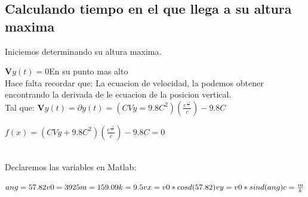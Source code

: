\documentclass{article}
\theoremstyle{mytheoremstyle}
\theoremstyle{mytheoremstyle}
\theoremstyle{myproblemstyle}
\begin{document}
\subsection*{Calculando tiempo en el que llega a su altura maxima}Iniciemos determinando su altura maxima.

\noindent $\mathbf{V}y(t) = 0$\indent   En su punto mas alto
\\Hace falta recordar que: La ecuacion de velocidad, la podemos obtener encontrando la derivada de le ecuacion de la posicion vertical.
\\Tal que: $\mathbf{V}y(t)=\partial y(t)=(CVy = 9.8C^2)(\frac{e^\frac{-t}{c}}{c})-9.8C$

$f(x)=(CVy + 9.8C^2)(\frac{e^\frac{-t}{c}}{c})-9.8C=0$

\noindent \\Declaremos las variables en Matlab:

$
ang=57.82\\
v0=3925\\
m=159.09\\
k=9.5\\ 
vx=v0*cosd(57.82)\\ 
vy=v0*sind(ang)\\
c=\frac{m}{k}
$
\end{document}
